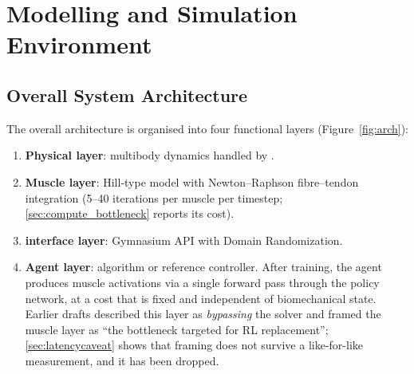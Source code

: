 \chapter{Modelling and Simulation Environment}

\section{Overall System Architecture}

The overall architecture is organised into four functional layers
(Figure~\ref{fig:arch}):
\begin{enumerate}
  \item \textbf{Physical layer}: multibody dynamics handled by \MuJoCo{}.
  \item \textbf{Muscle layer}: Hill-type model with Newton--Raphson
        fibre--tendon integration (5--40 iterations per muscle per timestep;
        \cref{sec:compute_bottleneck} reports its cost).
  \item \textbf{\RL{} interface layer}: Gymnasium API with Domain Randomization.
  \item \textbf{Agent layer}: \DRL{} algorithm or reference controller. After
        training, the agent produces muscle activations via a single forward
        pass through the policy network, at a cost that is fixed and independent
        of biomechanical state. Earlier drafts described this layer as
        \emph{bypassing} the solver and framed the muscle layer as ``the
        bottleneck targeted for RL replacement''; \cref{sec:latencycaveat} shows
        that framing does not survive a like-for-like measurement, and it has
        been dropped.
\end{enumerate}

